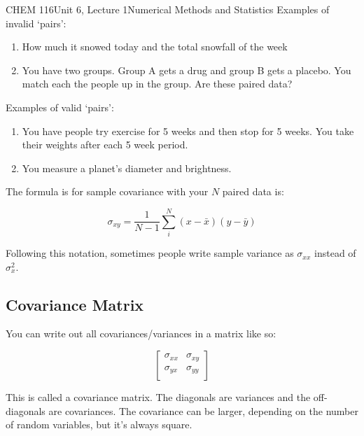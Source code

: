 \documentclass{article}
\begin{document}
\begin{tdoc}{CHEM 116}{Unit 6, Lecture 1}{Numerical Methods and Statistics}
Examples of invalid `pairs':

\begin{enumerate}

\item How much it snowed today and the total snowfall of the week

\item You have two groups. Group A gets a drug and group B gets a
  placebo. You match each the people up in the group. Are these paired data?

\end{enumerate}

Examples of valid `pairs':

\begin{enumerate}

  \item You have people try exercise for 5 weeks and then stop for 5
    weeks. You take their weights after each 5 week period. 

    \item You measure a planet's diameter and brightness.

\end{enumerate}


The formula is for sample covariance with your $N$ paired data is:

\begin{equation}
  \sigma_{xy}= \frac{1}{N - 1} \sum_i^N (x - \bar{x})(y - \bar{y})  
\end{equation}

Following this notation, sometimes people write sample variance as
$\sigma_{xx}$ instead of $\sigma_x^2$.

\subsection{Covariance Matrix}

You can write out all covariances/variances in a matrix like so:

\[
\left[\begin{array}{lr}
\sigma_{xx} & \sigma_{xy}\\
\sigma_{yx} & \sigma_{yy}\\
  \end{array}\right]
\]

This is called a covariance matrix. The diagonals are variances and
the off-diagonals are covariances. The covariance can be larger,
depending on the number of random variables, but it's always square.



\end{tdoc}
\end{document}
